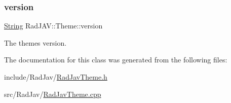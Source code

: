 \mbox{\label{class_rad_j_a_v_1_1_theme_a7cd795ecd11078a8416415cee5aec2f3}} 
\subsubsection{\texorpdfstring{version}{version}}
{\footnotesize\ttfamily \mbox{\hyperlink{class_rad_j_a_v_1_1_string}{String}} Rad\+J\+A\+V\+::\+Theme\+::version\hspace{0.3cm}{\ttfamily [protected]}}



The theme\textquotesingle{}s version. 



The documentation for this class was generated from the following files\+:\begin{DoxyCompactItemize}
\item 
include/\+Rad\+Jav/\mbox{\hyperlink{_rad_jav_theme_8h}{Rad\+Jav\+Theme.\+h}}\item 
src/\+Rad\+Jav/\mbox{\hyperlink{_rad_jav_theme_8cpp}{Rad\+Jav\+Theme.\+cpp}}\end{DoxyCompactItemize}
